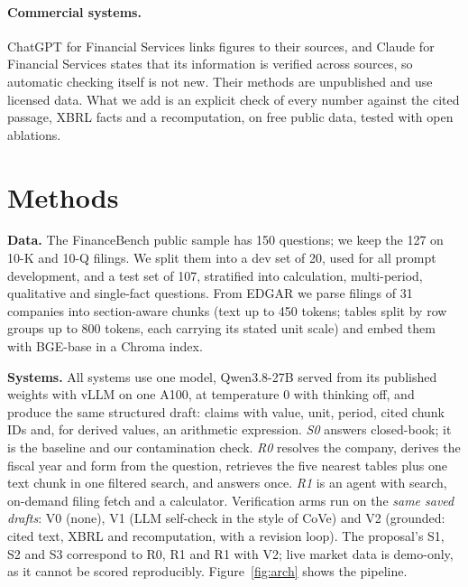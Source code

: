 \documentclass{article}
\begin{document}
\paragraph{Commercial systems.} ChatGPT for Financial Services \citep{openai2026chatgptfs} links figures to their sources, and Claude for Financial Services \citep{anthropic2025claudefs} states that its information is verified across sources, so automatic checking itself is not new. Their methods are unpublished and use licensed data. What we add is an explicit check of every number against the cited passage, XBRL facts and a recomputation, on free public data, tested with open ablations.

\section{Methods}\label{sec:methods}
\textbf{Data.} The FinanceBench public sample has 150 questions; we keep the 127 on 10-K and 10-Q filings. We split them into a dev set of 20, used for all prompt development, and a test set of 107, stratified into calculation, multi-period, qualitative and single-fact questions. From EDGAR we parse \Filings{} filings of 31 companies into section-aware chunks (text up to 450 tokens; tables split by row groups up to 800 tokens, each carrying its stated unit scale) and embed them with BGE-base in a Chroma index.

\textbf{Systems.} All systems use one model, Qwen3.8-27B served from its published weights with vLLM on one A100, at temperature 0 with thinking off, and produce the same structured draft: claims with value, unit, period, cited chunk IDs and, for derived values, an arithmetic expression. \emph{S0} answers closed-book; it is the baseline and our contamination check. \emph{R0} resolves the company, derives the fiscal year and form from the question, retrieves the five nearest tables plus one text chunk in one filtered search, and answers once. \emph{R1} is an agent with search, on-demand filing fetch and a calculator. Verification arms run on the \emph{same saved drafts}: V0 (none), V1 (LLM self-check in the style of CoVe) and V2 (grounded: cited text, XBRL and recomputation, with a revision loop). The proposal's S1, S2 and S3 correspond to R0, R1 and R1 with V2; live market data is demo-only, as it cannot be scored reproducibly. Figure~\ref{fig:arch} shows the pipeline.
\end{document}
